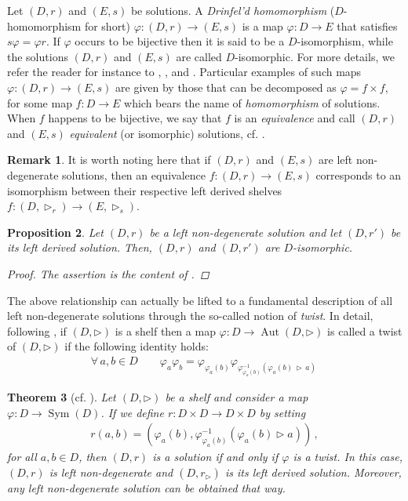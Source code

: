\documentclass[preprint,1p]{elsarticle}
\numberwithin{equation}{section}
\newtheorem{theor}{Theorem}[section]
\newtheorem{prop}[theor]{Proposition}
\theoremstyle{definition}               %
\newtheorem{rem}[theor]{Remark}
\newcommand{\tr}{\triangleright}
\DeclareMathOperator{\Sym}{Sym}
\DeclareMathOperator{\Aut}{Aut}
\begin{document}
\smallskip

Let $(D,r)$ and $(E,s)$ be solutions.
A \emph{Drinfel'd homomorphism} ($D$-homomorphism for short) $\varphi:(D,r) \to (E,s)$ is a map $\varphi:D \to E$ that satisfies $s \varphi = \varphi r$.
If $\varphi$ occurs to be bijective then it is said to be a $D$-isomorphism, while the solutions $(D,r)$ and $(E,s)$ are called $D$-isomorphic.
For more details, we refer the reader for instance to \cite{Do21}, \cite{KuMu00}, and \cite{So00}.
Particular examples of such maps $\varphi:(D,r) \to (E,s)$ are given by those that can be decomposed as $\varphi = f \times f$, for some  map $f:D \to E$ which bears the name of \emph{homomorphism} of solutions.
When $f$ happens to be bijective, we say that $f$ is an \emph{equivalence} and call $(D,r)$ and $(E,s)$ \emph{equivalent} (or isomorphic) solutions, cf. \cite{ESS99}.

\begin{rem}\label{rem:shelf_hom}
    It is worth noting here that if $(D,r)$ and $(E,s)$ are left non-degenerate solutions, then an equivalence $f:(D,r) \to (E,s)$ corresponds to an isomorphism between their respective left derived shelves $f:(D,\tr_r) \to (E,\tr_s)$.
\end{rem}

\begin{prop}\label{prop:derived_sol}
Let $\left(D, r\right)$ be a left non-degenerate solution and let $\left(D, r'\right)$ be its left derived solution.
Then, $\left(D, r\right)$ and $\left(D, r'\right)$ are $D$-isomorphic.
\begin{proof}
    The assertion is the content of \cite[Lemma~2.12]{DoRySte24}.
\end{proof}
\end{prop}

The above relationship can actually be lifted to a fundamental description of all left non-degenerate solutions through the so-called notion of \emph{twist}. 
In detail, following \cite[Definition 2.14]{DoRySte24}, if $(D,\tr)$ is a shelf then a map $\varphi:D \to \Aut(D,\tr)$ is called a {twist} of $(D,\tr)$ if the following identity holds:
\begin{align}\label{eq:twist}
    \forall\, a,b\in D\qquad
    \varphi_a\varphi_b = 
    \varphi_{\varphi_a(b)}\varphi_{\varphi^{-1}_{\varphi_a(b)}\left(\varphi_a(b)\, \tr\,a\right)} \,
\end{align}

\begin{theor}[cf. \cite{DoRySte24}]\label{thm:twist_solution}
    Let $(D,\tr)$ be a shelf and consider a map $\varphi:D \to {\Sym(D)}$.
    If we define $r:D \times D \to D \times D$ by setting
    \begin{align*}
        r(a,b) =
        \left(\varphi_a(b), \varphi^{-1}_{\varphi_a(b)}\left(\varphi_a(b) \tr a\right)\right) \,,
    \end{align*}
    for all $a,b \in D$, then $(D,r)$ is a solution if and only if $\varphi$ is a twist.
    In this case, $(D,r)$ is left non-degenerate and $(D,r_\tr)$ is its left derived solution.
    {Moreover, any left non-degenerate solution can be obtained that way.}
\end{theor}
\end{document}
